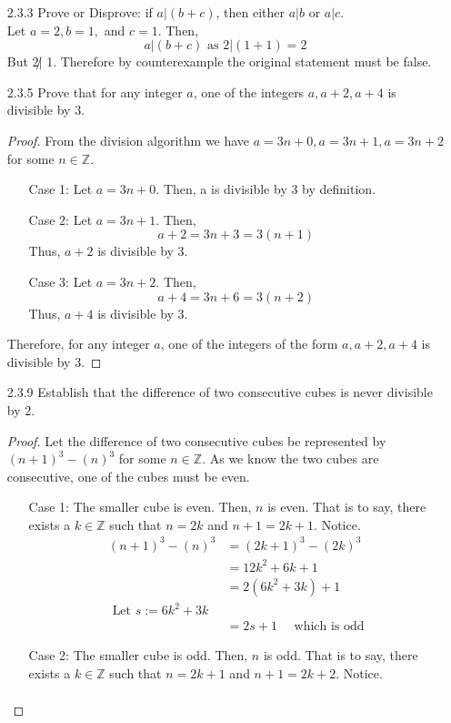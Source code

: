 \documentclass[12pt]{article}
\newcommand{\Z}{\mathds{Z}}
\begin{document}
\begin{enumerate}
	\item[2.3.3] Prove or Disprove: if $a | (b+c)$, then either $a | b$ or $a | c$.\\
		Let $a=2,b=1,$ and $c=1$. Then,
			\[a|(b+c) \text{ as } 2 | (1+1)=2\]
		But $2\not|$ 1. Therefore by counterexample the original statement must be false.
	\item[2.3.5] Prove that for any integer $a$, one of the integers $a, a+2,a+4$ is divisible by 3.
		\begin{proof}
			From the division algorithm we have $a=3n+0,a=3n+1,a=3n+2$ for some $n \in \Z$.
			\begin{enumerate}
				\item [Case 1:] Let $a=3n+0$. Then, a is divisible by 3 by definition.
				\item [Case 2:] Let $a=3n+1$. Then, 
					\[a+2 = 3n+3 = 3(n+1)\]
					Thus, $a+2$ is divisible by 3.
				\item[Case 3:] Let $a=3n+2$. Then,
					\[a+4=3n+6=3(n+2)\]
					Thus, $a+4$ is divisible by 3. 
			\end{enumerate}
			Therefore, for any integer $a$, one of the integers of the form $a, a+2,a+4$ is divisible by 3.
		\end{proof}
	\item[2.3.9] Establish that the difference of two consecutive cubes is never divisible by 2.
		\begin{proof}
			Let the difference of two consecutive cubes be represented by $(n+1)^3-(n)^3$ for some $n\in \Z$.
			As we know the two cubes are consecutive, one of the cubes must be even.
			\begin{enumerate}
				\item [Case 1:] The smaller cube is even. Then, $n$ is even. That is to say, there exists a $k\in\Z$ such that $n=2k$ and $n+1=2k+1$. Notice.
				\begin{align*}
					(n+1)^3-(n)^3 &= (2k+1)^3-(2k)^3 \\
								  &= 12k^2+6k+1 \\
								  &= 2(6k^2+3k)+1\\
								  \text{ Let } s:=6k^2+3k \\
								  &= 2s+1 \quad \text{ which is odd}			 	
				\end{align*}
				\item[Case 2:] The smaller cube is odd. Then, $n$ is odd. That is to say, there exists a $k\in\Z$ such that $n=2k+1$ and $n+1=2k+2$. Notice.
				\begin{align*}

\end{align*}
\end{enumerate}
\end{proof}
\end{enumerate}
\end{document}
